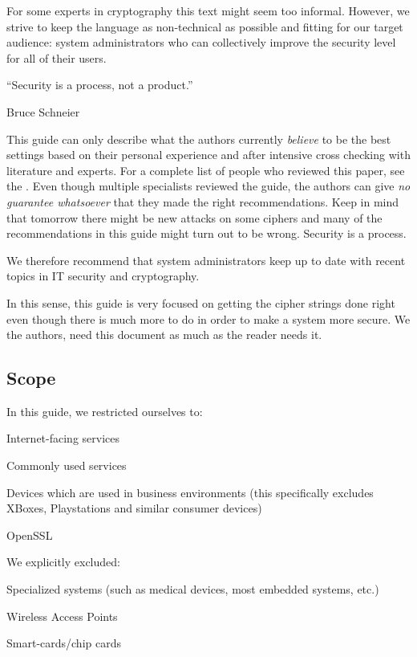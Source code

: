 For some experts in cryptography this text might seem too informal. However, we
strive to keep the language as non-technical as possible and fitting for our
target audience: system administrators who can collectively improve the
security level for all of their users. 



\epigraph{``Security is a process, not a product.''}{Bruce Schneier}

This guide can only describe what the authors currently
\emph{believe} to be the best settings based on their personal experience and
after intensive cross checking with literature and experts. For a complete list
of people who reviewed this paper, see the .
Even though multiple specialists reviewed the guide, the authors can give
\emph{no guarantee whatsoever} that they made the right recommendations. Keep in
mind that tomorrow there might be new attacks on some ciphers and many of the
recommendations in this guide might turn out to be wrong. Security is a
process.


We therefore recommend that system administrators keep up to date with recent
topics in IT security and cryptography. 


In this sense, this guide is very focused on getting the cipher strings done
right even though there is much more to do in order to make a system more
secure.  We the authors, need this document as much as the reader needs it.

\subsection*{Scope}
\label{section:Scope}

In this guide, we restricted ourselves to:
\begin{itemize*}
  \item Internet-facing services
  \item Commonly used services
  \item Devices which are used in business environments (this specifically excludes XBoxes, Playstations and similar consumer devices)
  \item OpenSSL 
\end{itemize*}

We explicitly excluded:
\begin{itemize*}
  \item Specialized systems (such as medical devices, most embedded systems, etc.)
  \item Wireless Access Points
  \item Smart-cards/chip cards
\end{itemize*}



